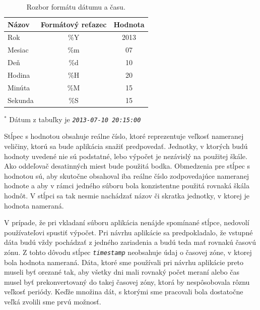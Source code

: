 \documentclass[a4paper,slovak,12pt,appendix]{article}
\begin{document}
\begin{table}[ht]
  \centering
  \caption{Rozbor formátu dátumu a času.}
  \label{tab-timestamp}
  \begin{threeparttable}
    \begin{tabular}{|l|c|c|}
      \hline
      \textbf{Názov}  &   \textbf{Formátový reťazec}  &   \textbf{Hodnota}  \\ \hline
      Rok     & \%Y & 2013 \\ \hline
      Mesiac  & \%m & 07 \\ \hline
      Deň     & \%d & 10 \\ \hline
      Hodina  & \%H & 20 \\ \hline
      Minúta  & \%M & 15 \\ \hline
      Sekunda & \%S & 15 \\ \hline
    \end{tabular}
    \begin{tablenotes} \footnotesize
      \item $^{*}$ Dátum z tabuľky je \texttt{\textit{2013-07-10 20:15:00}}
    \end{tablenotes}
  \end{threeparttable}
\end{table}

Stĺpec s hodnotou obsahuje reálne číslo, ktoré reprezentuje veľkosť nameranej
veličiny, ktorú sa bude aplikácia snažiť predpovedať. Jednotky, v ktorých budú
hodnoty uvedené nie sú podstatné, lebo výpočet je nezávislý na použitej škále. Ako
oddeľovač desatinných miest bude použitá bodka. Obmedzenia pre stĺpec s hodnotou
sú, aby skutočne obsahoval iba reálne číslo zodpovedajúce
nameranej hodnote a aby v rámci jedného súboru bola konzistentne použitá
rovnaká škála hodnôt. V stĺpci sa tak nesmie nachádzať názov či skratka
jednotky, v ktorej je hodnota nameraná.

V prípade, že pri vkladaní súboru aplikácia nenájde spomínané stĺpce, nedovolí
používateľovi spustiť výpočet. Pri návrhu aplikácie sa predpokladalo, že vstupné
dáta budú vždy pochádzať z jedného zariadenia a budú teda mať rovnakú časovú
zónu. Z tohto dôvodu stĺpec \texttt{\textit{timestamp}} neobsahuje údaj o časovej zóne,
v ktorej bola hodnota nameraná. Dáta, ktoré sme používali pri návrhu aplikácie
preto museli byť orezané tak, aby všetky dni mali rovnaký počet meraní alebo
čas musel byť prekonvertovaný do takej časovej zóny, ktorá by nespôsobovala
rôznu veľkosť periódy. Keďže množina dát, s ktorými sme pracovali bola dostatočne
veľká zvolili sme prvú možnosť.
\end{document}
